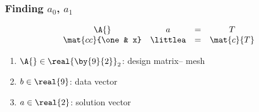 \begin{frame}\frametitle{Finding $a_{0}$, $a_{1}$ }
\begin{equation}
	\begin{array}{cccc}
		\A{} & a & = & T \\
		\mat{cc}{\one & x} & \littlea & = & \mat{c}{T}\\
	\end{array}
\label{eq:Dramatis Personae}
\end{equation}
\begin{enumerate}
	\item $\A{}\in\real{\by{9}{2}}_{2}$: design matrix-- mesh
	\item $b\in\real{9}$: data vector
	\item $a\in\real{2}$: solution vector
\end{enumerate}
\end{frame}


\endinput  %

